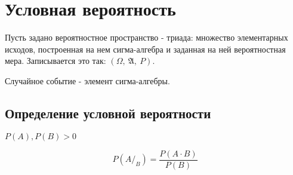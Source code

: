 \documentclass[../Main.tex]{subfiles}
\begin{document}
\chapter{Условная вероятность}

Пусть задано вероятностное пространство - триада: множество элементарных исходов, построенная на нем сигма-алгебра и заданная на ней вероятностная мера. Записывается это так: \((\Omega, \ \mathfrak{A}, \ P)\).

Случайное событие - элемент сигма-алгебры.

\section{Определение условной вероятности}

\(P(A), P(B) > 0\)

\[P(A/_B) = \dfrac{P(A \cdot B)}{P(B)}\]


\pf{
] \(B = \Omega, \ A = A/_\Omega\)

\(P(A) = P(A/_\Omega) = \dfrac{P(A \cdot \Omega)}{P(\Omega)} = P(A)\)
}
\end{document}
